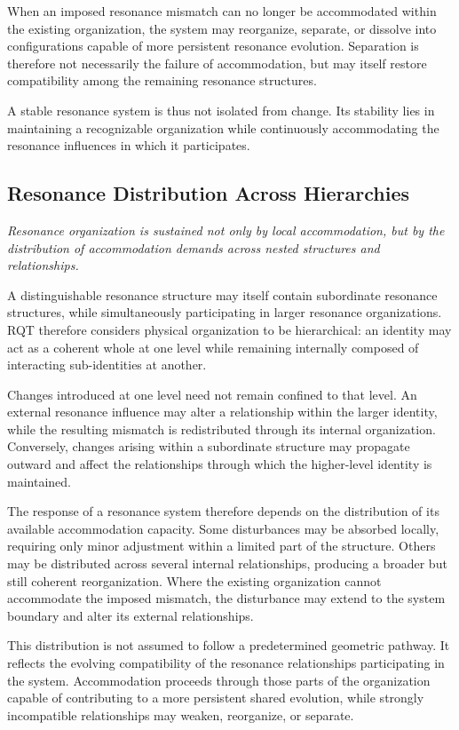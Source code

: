 \documentclass[11pt,a4paper]{article}
\begin{document}
When an imposed resonance mismatch can no longer be accommodated within the existing organization, the system may reorganize, separate, or dissolve into configurations capable of more persistent resonance evolution. Separation is therefore not necessarily the failure of accommodation, but may itself restore compatibility among the remaining resonance structures.

A stable resonance system is thus not isolated from change. Its stability lies in maintaining a recognizable organization while continuously accommodating the resonance influences in which it participates.


\subsection{Resonance Distribution Across Hierarchies}

\emph{Resonance organization is sustained not only by local accommodation, but by the distribution of accommodation demands across nested structures and relationships.}
\vspace{0.6em} 

A distinguishable resonance structure may itself contain subordinate resonance structures, while simultaneously participating in larger resonance organizations. RQT therefore considers physical organization to be hierarchical: an identity may act as a coherent whole at one level while remaining internally composed of interacting sub-identities at another.

Changes introduced at one level need not remain confined to that level. An external resonance influence may alter a relationship within the larger identity, while the resulting mismatch is redistributed through its internal organization. Conversely, changes arising within a subordinate structure may propagate outward and affect the relationships through which the higher-level identity is maintained.

The response of a resonance system therefore depends on the distribution of its available accommodation capacity. Some disturbances may be absorbed locally, requiring only minor adjustment within a limited part of the structure. Others may be distributed across several internal relationships, producing a broader but still coherent reorganization. Where the existing organization cannot accommodate the imposed mismatch, the disturbance may extend to the system boundary and alter its external relationships.

This distribution is not assumed to follow a predetermined geometric pathway. It reflects the evolving compatibility of the resonance relationships participating in the system. Accommodation proceeds through those parts of the organization capable of contributing to a more persistent shared evolution, while strongly incompatible relationships may weaken, reorganize, or separate.
\end{document}
